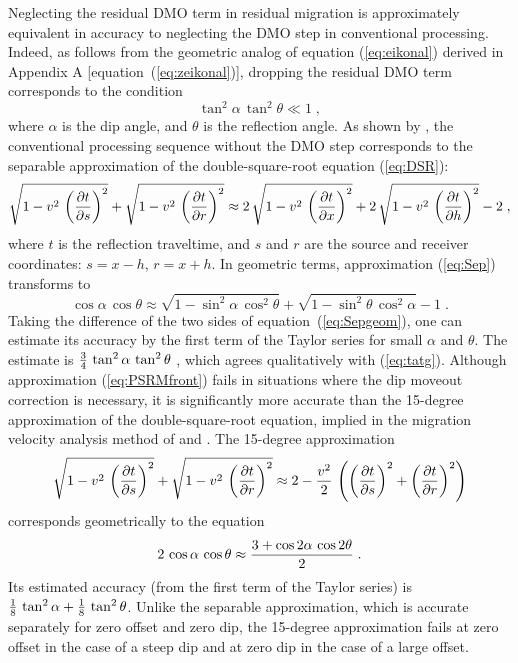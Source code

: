 Neglecting the residual DMO term in residual migration is
approximately equivalent in accuracy to neglecting the DMO step in
conventional processing. Indeed, as follows from the geometric analog
of equation (\ref{eq:eikonal}) derived in Appendix A
[equation~(\ref{eq:zeikonal})], dropping the residual
DMO term corresponds to the condition
 \begin{equation}
\tan^2{\alpha}\,\tan^2{\theta} \ll 1\;,
\label{eq:tatg}
\end{equation}
where $\alpha$ is the dip angle, and $\theta$ is the reflection angle.
As shown by \cite{GEO45.12.17531779}, the conventional processing
sequence without the DMO step corresponds to the separable
approximation of the double-square-root equation (\ref{eq:DSR}):
\begin{equation}
\sqrt{1 -  v^2\,\left({{\partial t} \over {\partial s}}\right)^2} +
\sqrt{1 -  v^2\,\left({{\partial t} \over {\partial r}}\right)^2}
\approx
2\,\sqrt{1 -  v^2\,\left({{\partial t} \over {\partial x}}\right)^2} +
2\,\sqrt{1 -  v^2\,\left({{\partial t} \over {\partial h}}\right)^2} -
2\;,
\label{eq:Sep}
\end{equation}
where $t$ is the reflection traveltime, and $s$ and $r$ are the source and
receiver coordinates: $s=x-h$, $r=x+h$.
In geometric terms, approximation (\ref{eq:Sep}) transforms to
\begin{equation}
\cos{\alpha}\,\cos{\theta}
\approx
\sqrt{1 -  \sin^2{\alpha}\,\cos^2{\theta}} +
\sqrt{1 -  \sin^2{\theta}\,\cos^2{\alpha}} - 1\;.
\label{eq:Sepgeom}
\end{equation}
Taking the difference of the two sides of
equation~(\ref{eq:Sepgeom}), one can estimate its accuracy by the
first term of the Taylor series for small $\alpha$ and $\theta$. The
estimate is ${3 \over 4}\,\tan^2{\alpha}\,\tan^2{\theta}$
\cite[]{GEO45.12.17531779}, which agrees qualitatively with
(\ref{eq:tatg}). Although approximation (\ref{eq:PSRMfront}) fails in situations
where the dip moveout correction is necessary, it is significantly
more accurate than the 15-degree approximation of the
double-square-root equation, implied in the migration velocity
analysis method of \cite{GEO49.10.16641674} and \cite{abma}.  The
15-degree approximation
\begin{equation}
\sqrt{1 -  v^2\,\left({{\partial t} \over {\partial s}}\right)^2} +
\sqrt{1 -  v^2\,\left({{\partial t} \over {\partial r}}\right)^2}
\approx
2 - {v^2 \over 2}\,
\left(  \left({{\partial t} \over {\partial s}}\right)^2 +
        \left({{\partial t} \over {\partial r}}\right)^2\right)
\label{eq:FDeg}
\end{equation}
corresponds geometrically to the equation 
\begin{equation}
2\,\cos{\alpha}\,\cos{\theta}
\approx
{{3 + \cos{2\alpha}\,\cos{2\theta}} \over 2}\;.
\label{eq:FDgeom}
\end{equation} 
Its estimated accuracy (from the first term of the Taylor series)
is ${1 \over 8}\,\tan^2{\alpha} + {1 \over
8}\,\tan^2{\theta}$.  Unlike the separable approximation, which is
accurate separately for zero offset and zero dip, the 15-degree
approximation fails at zero offset in the case of a steep dip and at zero
dip in the case of a large offset.

